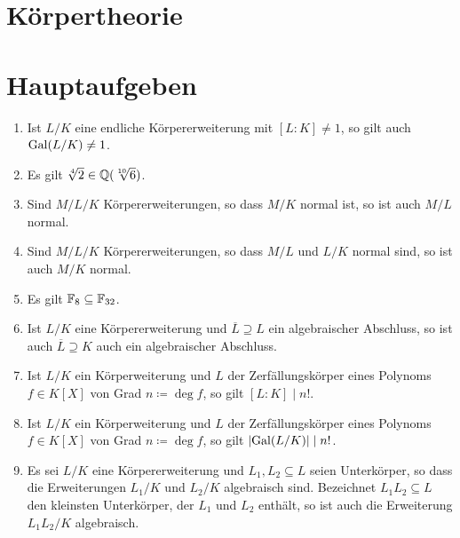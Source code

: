 \section{Körpertheorie}





\section{Hauptaufgeben}


\begin{question}[subtitle = Wahr oder Falsch?]
  \begin{enumerate}
    \item
      Ist $L/K$ eine endliche Körpererweiterung mit $[L : K] \neq 1$, so gilt auch $\operatorname{Gal}(L/K) \neq 1$.
    \item
      Es gilt $\sqrt[4]{2} \in \mathbb{Q}(\sqrt[10]{6})$.
    \item
      Sind $M/L/K$ Körpererweiterungen, so dass $M/K$ normal ist, so ist auch $M/L$ normal.
    \item
      Sind $M/L/K$ Körpererweiterungen, so dass $M/L$ und $L/K$ normal sind, so ist auch $M/K$ normal.
    \item
      Es gilt $\mathbb{F}_{8} \subseteq \mathbb{F}_{32}$.
    \item
      Ist $L/K$ eine Körpererweiterung und $\overline{L} \supseteq L$ ein algebraischer Abschluss, so ist auch $\overline{L} \supseteq K$ auch ein algebraischer Abschluss.
    \item
      Ist $L/K$ ein Körperweiterung und $L$ der Zerfällungskörper eines Polynoms $f \in K[X]$ von Grad $n \coloneqq \deg f$, so gilt $[L : K] \mid n!$.
    \item
      Ist $L/K$ ein Körperweiterung und $L$ der Zerfällungskörper eines Polynoms $f \in K[X]$ von Grad $n \coloneqq \deg f$, so gilt $|{\operatorname{Gal}(L/K)}| \mid n!$.
    \item
      Es sei $L/K$ eine Körpererweiterung und $L_1, L_2 \subseteq L$ seien Unterkörper, so dass die Erweiterungen $L_1/K$ und $L_2/K$ algebraisch sind.
      Bezeichnet $L_1 L_2 \subseteq L$ den kleinsten Unterkörper, der $L_1$ und $L_2$ enthält, so ist auch die Erweiterung $L_1 L_2/K$ algebraisch.
  \end{enumerate}
\end{question}


